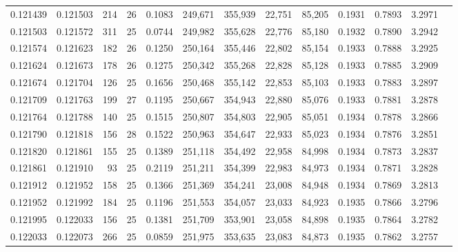 \begin{tabular}{rrrrrrrrrrrrr}
0.121439 & 0.121503 & 214 &  26 &                                     0.1083 & 249,671 & 355,939 &  22,751 &  85,205 & 0.1931 & 0.7893 & 3.2971 \\
0.121503 & 0.121572 & 311 &  25 &                                     0.0744 & 249,982 & 355,628 &  22,776 &  85,180 & 0.1932 & 0.7890 & 3.2942 \\
0.121574 & 0.121623 & 182 &  26 &                                     0.1250 & 250,164 & 355,446 &  22,802 &  85,154 & 0.1933 & 0.7888 & 3.2925 \\
0.121624 & 0.121673 & 178 &  26 &                                     0.1275 & 250,342 & 355,268 &  22,828 &  85,128 & 0.1933 & 0.7885 & 3.2909 \\
0.121674 & 0.121704 & 126 &  25 &                                     0.1656 & 250,468 & 355,142 &  22,853 &  85,103 & 0.1933 & 0.7883 & 3.2897 \\
0.121709 & 0.121763 & 199 &  27 &                                     0.1195 & 250,667 & 354,943 &  22,880 &  85,076 & 0.1933 & 0.7881 & 3.2878 \\
0.121764 & 0.121788 & 140 &  25 &                                     0.1515 & 250,807 & 354,803 &  22,905 &  85,051 & 0.1934 & 0.7878 & 3.2866 \\
0.121790 & 0.121818 & 156 &  28 &                                     0.1522 & 250,963 & 354,647 &  22,933 &  85,023 & 0.1934 & 0.7876 & 3.2851 \\
0.121820 & 0.121861 & 155 &  25 &                                     0.1389 & 251,118 & 354,492 &  22,958 &  84,998 & 0.1934 & 0.7873 & 3.2837 \\
0.121861 & 0.121910 &  93 &  25 &                                     0.2119 & 251,211 & 354,399 &  22,983 &  84,973 & 0.1934 & 0.7871 & 3.2828 \\
0.121912 & 0.121952 & 158 &  25 &                                     0.1366 & 251,369 & 354,241 &  23,008 &  84,948 & 0.1934 & 0.7869 & 3.2813 \\
0.121952 & 0.121992 & 184 &  25 &                                     0.1196 & 251,553 & 354,057 &  23,033 &  84,923 & 0.1935 & 0.7866 & 3.2796 \\
0.121995 & 0.122033 & 156 &  25 &                                     0.1381 & 251,709 & 353,901 &  23,058 &  84,898 & 0.1935 & 0.7864 & 3.2782 \\
0.122033 & 0.122073 & 266 &  25 &                                     0.0859 & 251,975 & 353,635 &  23,083 &  84,873 & 0.1935 & 0.7862 & 3.2757 \\

\end{tabular}
